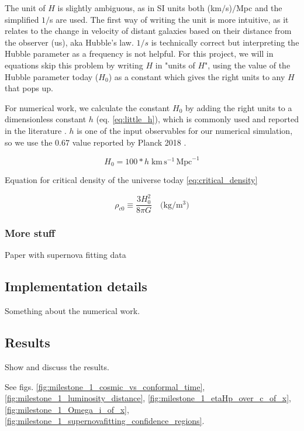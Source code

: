 The unit of $H$ is slightly ambiguous, as in SI units both (km$/$s)$/$Mpc and the simplified $1/$s are used. The first way of writing the unit is more intuitive, as it relates to the change in velocity of distant galaxies based on their distance from the observer (us), aka Hubble's law. $1/s$ is technically correct but interpreting the Hubble parameter as a frequency is not helpful. For this project, we will in equations skip this problem by writing $H$ in "units of $H$", using the value of the Hubble parameter today ($H_0$) as a constant which gives the right units to any $H$ that pops up.

For numerical work, we calculate the constant $H_0$ by adding the right units to a dimensionless constant $h$ (eq. \ref{eq:little_h}), which is commonly used and reported in the literature \citep{crotonDamnYouLittle2013}. $h$ is one of the input observables for our numerical simulation, so we use the $0.67$ value reported by Planck 2018 \citep{collaborationPlanck2018Results2020}.

\begin{equation}\label{eq:little_h}
H_0 = 100 * h \; \text{km} \, \text{s}^{-1} \, \text{Mpc}^{-1}
\end{equation}

Equation for critical density of the universe today \ref{eq:critical_density}

\begin{equation}\label{eq:critical_density}
\rho_{c0} \equiv \frac{3H_0^2}{8\pi G} \quad \text{(kg}/\text{m}^3\text{)}
\end{equation}

\subsubsection{More stuff}

Paper with supernova fitting data \citet{betouleImprovedCosmologicalConstraints2014}

\subsection{Implementation details}
Something about the numerical work.

\subsection{Results}
Show and discuss the results.

See figs. \ref{fig:milestone_1_cosmic_vs_conformal_time}, \ref{fig:milestone_1_luminosity_distance}, \ref{fig:milestone_1_etaHp_over_c_of_x}, \ref{fig:milestone_1_Omega_i_of_x}, \ref{fig:milestone_1_supernovafitting_confidence_regions}.

